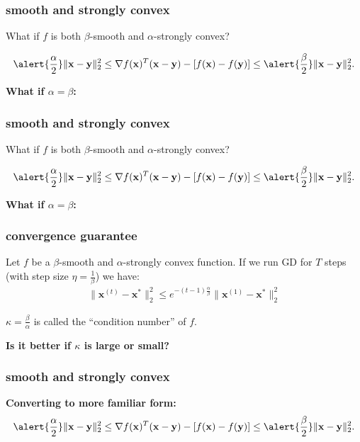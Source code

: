 \documentclass[compress]{beamer}
\newcommand{\bv}[1]{\mathbf{#1}}
\begin{document}
\begin{frame}[t]
	\frametitle{smooth and strongly convex}
	\begin{center}
	What if $f$ is both $\beta$-smooth and $\alpha$-strongly convex?
	\end{center}
	\begin{align*}
	\alert{\frac{\alpha}{2}}\|\bv{x} - \bv{y}\|_2^2 \leq \nabla f(\bv{x})^T(\bv{x} - \bv{y}) - \left[f(\bv{x}) - f(\bv{y})\right] \leq \alert{\frac{\beta}{2}}\|\bv{x} - \bv{y}\|_2^2.
	\end{align*}
	
	\textbf{What if $\alpha = \beta$:}
	
\end{frame}

\begin{frame}[t]
	\frametitle{smooth and strongly convex}
	\begin{center}
		What if $f$ is both $\beta$-smooth and $\alpha$-strongly convex?
	\end{center}
	\begin{align*}
	\alert{\frac{\alpha}{2}}\|\bv{x} - \bv{y}\|_2^2 \leq \nabla f(\bv{x})^T(\bv{x} - \bv{y}) - \left[f(\bv{x}) - f(\bv{y})\right] \leq \alert{\frac{\beta}{2}}\|\bv{x} - \bv{y}\|_2^2.
	\end{align*}
	
	\textbf{What if $\alpha = \beta$:}
\end{frame}

\begin{frame}[t]
	\frametitle{convergence guarantee}
	\begin{theorem}
		Let $f$ be a $\beta$-smooth and $\alpha$-strongly convex function. If we run GD for $T$ steps (with step size $\eta = \frac{1}{\beta}$) we have:
		\begin{align*}
		\|\bv{x}^{(t)} - \bv{x}^*\|_2^2 \leq e^{-(t-1)\frac{\alpha}{\beta}} \|\bv{x}^{(1)} - \bv{x}^*\|_2^2
		\end{align*} 
	\end{theorem}	
	\begin{center}
		\alert{$\kappa = \frac{\beta}{\alpha}$} is called the ``condition number'' of $f$. 
		
		\textbf{Is it better if $\kappa$ is large or small?}
	\end{center}
\end{frame}

\begin{frame}[t]
	\frametitle{smooth and strongly convex}
	\textbf{Converting to more familiar form:}
	\begin{align*}
	\alert{\frac{\alpha}{2}}\|\bv{x} - \bv{y}\|_2^2 \leq \nabla f(\bv{x})^T(\bv{x} - \bv{y}) - \left[f(\bv{x}) - f(\bv{y})\right] \leq \alert{\frac{\beta}{2}}\|\bv{x} - \bv{y}\|_2^2.
	\end{align*}	
\end{frame}
\end{document}
